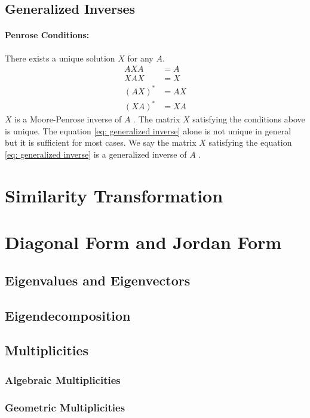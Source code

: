 \documentclass{article}
\begin{document}
\subsection{Generalized Inverses}
\paragraph{Penrose Conditions:} There exists a unique solution \(X\) for any \(A\).
\begin{align} \label{eq: generalized inverse}
AXA &= A \\
XAX &= X \\
(AX)^* &= AX \\
(XA)^* &= XA
\end{align}
\(X\) is a Moore-Penrose inverse of \(A\) \citep{Penrose_1955}. The matrix \(X\) satisfying the conditions above is unique. The equation \ref{eq: generalized inverse} alone is not unique in general but it is sufficient for most cases. We say the matrix \(X\) satisfying the equation \ref{eq: generalized inverse} is a generalized inverse of \(A\) \citep{Searle_Khuri_2017}.


\section{Similarity Transformation}


\section{Diagonal Form and Jordan Form}

\subsection{Eigenvalues and Eigenvectors}

\subsection{Eigendecomposition}

\subsection{Multiplicities}

\subsubsection{Algebraic Multiplicities}

\subsubsection{Geometric Multiplicities}
\end{document}
